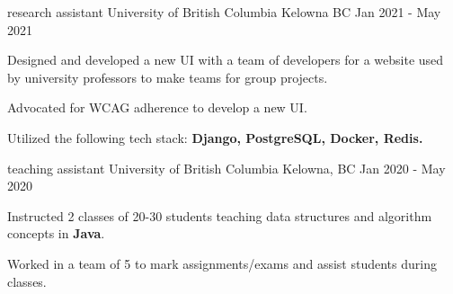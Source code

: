 \begin{cventries}


  \cventry
    {research assistant} %
    {University of British Columbia} %
    {Kelowna BC} %
    {Jan 2021 - May 2021} %
    {
      \begin{cvitems} %
        \item {Designed and developed a new UI with a team of developers for a website used by university professors to make teams for group projects.}     
        \item {Advocated for WCAG adherence to develop a new UI.}     
        \item {Utilized the following tech stack:  \textbf{Django, PostgreSQL, Docker, Redis.}}
      \end{cvitems}
    }


  \cventry
    {teaching assistant} %
    {University of British Columbia} %
    {Kelowna, BC} %
    {Jan 2020 - May 2020} %
    {
      \begin{cvitems} %
        \item {Instructed 2 classes of 20-30 students teaching data structures and algorithm concepts in \textbf{Java}.} 
        \item {Worked in a team of 5 to mark assignments/exams and assist students during classes.} 
      \end{cvitems}
    }


\end{cventries}
